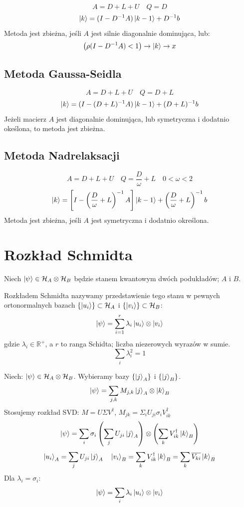 \documentclass{../notatki}
\begin{document}
$$
A = D + L + U \quad Q = D
$$
$$
\ket{k} = (I - D^{-1}A) \ket{k - 1} + D^{-1} b
$$
Metoda jest zbieżna, jeśli $A$ jest silnie diagonalnie dominująca, lub:
$$
\left(\rho(I - D^{-1}A) < 1 \right)
\rightarrow \ket{k} \to x
$$

\subsection{Metoda Gaussa-Seidla}

$$
A = D + L + U \quad Q = D + L
$$
$$
\ket{k} = (I - (D + L)^{-1}A) \ket{k - 1} + (D + L)^{-1}b
$$
Jeżeli macierz $A$ jest diagonalnie dominująca, lub symetryczna i
dodatnio okeślona, to metoda jest zbieżna.

\subsection{Metoda Nadrelaksacji}

$$
A = D + L + U \quad Q = \frac{D}{\omega} + L \quad 0 < \omega < 2
$$
$$
\ket{k} = \left[I - \left(\frac{D}{\omega} + L\right)^{-1}A\right]
\ket{k - 1} + \left(\frac{D}{\omega} + L\right)^{-1} b
$$
Metoda jest zbieżna, jeśli $A$ jest symetryczna i dodatnio określona.

\section{Rozkład Schmidta}

Niech $\ket{\psi} \in \mathcal{H}_A \otimes \mathcal{H}_B$ będzie
stanem kwantowym dwóch podukładów; $A$ i $B$.

Rozkładem Schmidta nazywamy przedstawienie tego stanu w pewnych ortonormalnych
bazach $\{\ket{u_i}\} \subset \mathcal{H}_A$ i $\{\ket{v_i}\} \subset
\mathcal{H}_B$:
$$
\ket{\psi} = \sum_{i=1}^{r} \lambda_i \ket{u_i} \otimes \ket{v_i}
$$
gdzie $\lambda_i \in \mathbb{R}^+$, a $r$ to ranga Schidta; liczba
niezerowych wyrazów w sumie.
$$
\sum_i \lambda_i^2 = 1
$$

\begin{examplebox}
  Niech: $\ket{\psi} \in \mathcal{H}_A \otimes \mathcal{H}_B$.
  Wybieramy bazy $\{\ket{j}_A\}$ i $\{\ket{j}_B\}$.
  $$
  \ket{\psi} = \sum_{j,k} M_{j,k} \ket{j}_A \otimes \ket{k}_B
  $$
  Stosujemy rozkład SVD: $M = U \Sigma V^\dag$, $M_{jk} = \Sigma_i
  U_{ji} \sigma_i V^\dag_{ik}$
  $$
  \ket{\psi} = \sum_i \sigma_i \left(\sum_j U_{ji} \ket{j}_A\right)
  \otimes \left(\sum_k V^\dag_{ik} \ket{k}_B\right)
  $$
  $$
  \ket{u_i}_A = \sum_j U_{ji} \ket{j}_A \quad \ket{v_i}_B = \sum_k
  V^\dag_{ik} \ket{k}_B = \sum_k \overline{V_{ki}} \ket{k}_B
  $$
  Dla $\lambda_i = \sigma_i$:
  $$
  \ket{\psi} = \sum_i \lambda_i \ket{u_i} \otimes \ket{v_i}
  $$
\end{examplebox}
\end{document}
